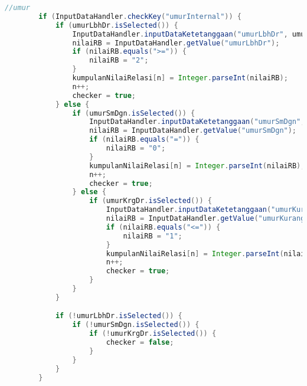 \begin{lstlisting}[language=Java, caption=TampilanKondisiKetetanggaan.java]
        //umur
        if (InputDataHandler.checkKey("umurInternal")) {
            if (umurLbhDr.isSelected()) {
                InputDataHandler.inputDataKetetanggaan("umurLbhDr", umurLbhDr.getText());
                nilaiRB = InputDataHandler.getValue("umurLbhDr");
                if (nilaiRB.equals(">=")) {
                    nilaiRB = "2";
                }
                kumpulanNilaiRelasi[n] = Integer.parseInt(nilaiRB);
                n++;
                checker = true;
            } else {
                if (umurSmDgn.isSelected()) {
                    InputDataHandler.inputDataKetetanggaan("umurSmDgn", umurSmDgn.getText());
                    nilaiRB = InputDataHandler.getValue("umurSmDgn");
                    if (nilaiRB.equals("=")) {
                        nilaiRB = "0";
                    }
                    kumpulanNilaiRelasi[n] = Integer.parseInt(nilaiRB);
                    n++;
                    checker = true;
                } else {
                    if (umurKrgDr.isSelected()) {
                        InputDataHandler.inputDataKetetanggaan("umurKurangDari", umurKrgDr.getText());
                        nilaiRB = InputDataHandler.getValue("umurKurangDari");
                        if (nilaiRB.equals("<=")) {
                            nilaiRB = "1";
                        }
                        kumpulanNilaiRelasi[n] = Integer.parseInt(nilaiRB);
                        n++;
                        checker = true;
                    }
                }
            }

            if (!umurLbhDr.isSelected()) {
                if (!umurSmDgn.isSelected()) {
                    if (!umurKrgDr.isSelected()) {
                        checker = false;
                    }
                }
            }
        }


\end{lstlisting}
